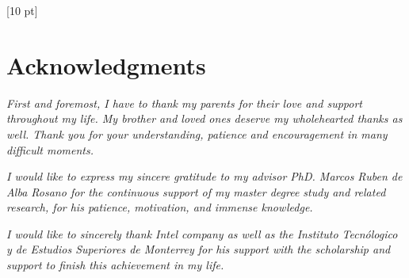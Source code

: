 \titleformat{\chapter}{\Huge\bfseries}{\thechapter}{0 pt}{\rule{340 pt}{3 pt}\\}
\titlespacing{\chapter}{100 pt}{-25 pt}{40 pt}[10 pt]	
\pagestyle{fancy}
\fancyhead[RO,RE]{\thepage}
\fancyfoot[CO,CE]{}

\chapter*{Acknowledgments}

\vspace{140 pt}

\normalsize
\begin{flushright}
\textit{First and foremost, I have to thank my parents for their love and support
throughout my life. My brother and loved ones deserve my wholehearted thanks as
well. Thank you for your understanding, patience and encouragement in many
difficult moments.}

\textit{I would like to express my sincere gratitude to my advisor PhD.
Marcos Ruben de Alba Rosano for the continuous support of my master degree 
study and related research, for  his patience, motivation,
and immense knowledge.}

\textit{I would like to sincerely thank Intel company as well as the Instituto
Tecn\'ologico y de Estudios Superiores de Monterrey for his support with the
scholarship and support to finish this achievement in my life.}

\end{flushright}
\clearpage
